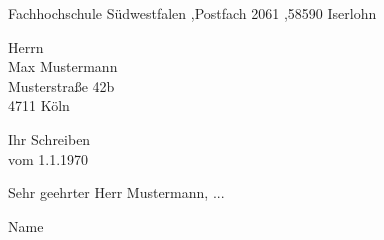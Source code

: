 \documentclass[a4paper, 10pt, parskip=off, headheight=25mm, footheight=25mm]{scrartcl}
\newcommand{\name}{{{Name}}}
\newcommand{\postfach}{Fachhochschule Südwestfalen \sep Postfach 2061 \sep 58590 Iserlohn}
\begin{document}
\daten %
\begin{addmargin}[0mm]{\randbreite}

\begin{absender}
\postfach
\end{absender}

\begin{empfaenger}
{{Herrn \\ Max Mustermann \\ Musterstraße 42b \\ 4711 Köln }}
\end{empfaenger}

\begin{betreff}
{{Ihr Schreiben\\ vom 1.1.1970}}
\end{betreff}

\begin{text}
{{Sehr geehrter Herr Mustermann, ... }}
\end{text}

\vspace{15mm}
\name

\end{addmargin}
\end{document}
